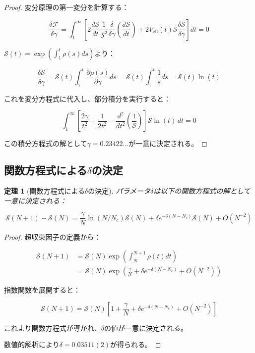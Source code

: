 \documentclass[12pt]{article}
\newtheorem{theorem}{定理}
\begin{document}
\begin{proof}
変分原理の第一変分を計算する：

\begin{equation}
\frac{\delta \mathcal{F}}{\delta \gamma} = \int_1^{\infty} \left[2\frac{d\mathcal{S}}{dt} \frac{1}{\mathcal{S}^2} \frac{\delta}{\delta \gamma}\left(\frac{d\mathcal{S}}{dt}\right) + 2V_{\text{eff}}(t) \mathcal{S} \frac{\delta \mathcal{S}}{\delta \gamma}\right] dt = 0
\end{equation}

$\mathcal{S}(t) = \exp\left(\int_1^t \rho(s) ds\right)$より：

\begin{equation}
\frac{\delta \mathcal{S}}{\delta \gamma} = \mathcal{S}(t) \int_1^t \frac{\partial \rho(s)}{\partial \gamma} ds = \mathcal{S}(t) \int_1^t \frac{1}{s} ds = \mathcal{S}(t) \ln(t)
\end{equation}

これを変分方程式に代入し、部分積分を実行すると：

\begin{equation}
\int_1^{\infty} \left[\frac{2\gamma}{t^2} + \frac{1}{2t^2} - \frac{d^2}{dt^2}\left(\frac{1}{\mathcal{S}}\right)\right] \mathcal{S} \ln(t) \, dt = 0
\end{equation}

この積分方程式の解として$\gamma = 0.23422...$が一意に決定される。
\end{proof}

\subsection{関数方程式による$\delta$の決定}

\begin{theorem}[関数方程式による$\delta$の決定]
パラメータ$\delta$は以下の関数方程式の解として一意に決定される：

\begin{equation}
\mathcal{S}(N+1) - \mathcal{S}(N) = \frac{\gamma}{N} \ln(N/N_c) \mathcal{S}(N) + \delta e^{-\delta(N-N_c)} \mathcal{S}(N) + O(N^{-2})
\end{equation}
\end{theorem}

\begin{proof}
超収束因子の定義から：

\begin{align}
\mathcal{S}(N+1) &= \mathcal{S}(N) \exp\left(\int_N^{N+1} \rho(t) dt\right) \\
&= \mathcal{S}(N) \exp\left(\frac{\gamma}{N} + \delta e^{-\delta(N-N_c)} + O(N^{-2})\right)
\end{align}

指数関数を展開すると：

\begin{equation}
\mathcal{S}(N+1) = \mathcal{S}(N) \left[1 + \frac{\gamma}{N} + \delta e^{-\delta(N-N_c)} + O(N^{-2})\right]
\end{equation}

これより関数方程式が導かれ、$\delta$の値が一意に決定される。

数値的解析により$\delta = 0.03511(2)$が得られる。
\end{proof}
\end{document}
